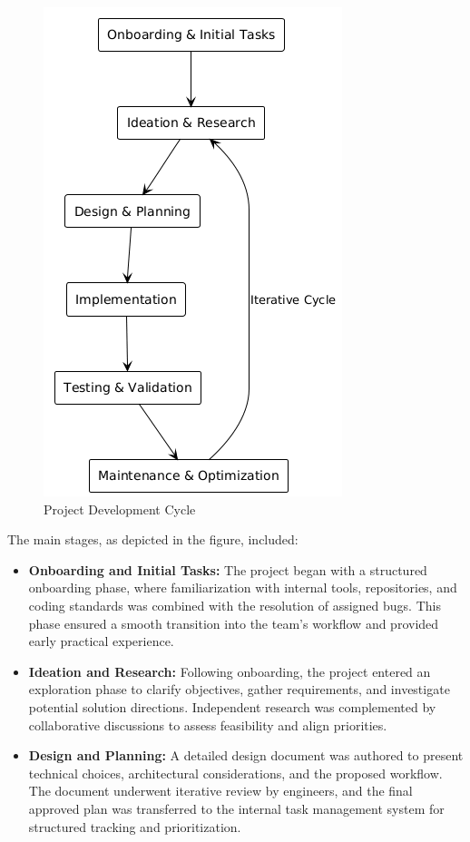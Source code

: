 \begin{spacing}{1.2}
\begin{figure}[H]
    \centering
    \includegraphics[scale=0.5]{Images/dev_process.png}
    \caption{Project Development Cycle}
    \label{fig:development_cycle}
\end{figure}

The main stages, as depicted in the figure, included:

\begin{itemize}
    \item \textbf{Onboarding and Initial Tasks:} The project began with a structured onboarding phase, where familiarization with internal tools, repositories, and coding standards was combined with the resolution of assigned bugs. This phase ensured a smooth transition into the team’s workflow and provided early practical experience.

    \item \textbf{Ideation and Research:} Following onboarding, the project entered an exploration phase to clarify objectives, gather requirements, and investigate potential solution directions. Independent research was complemented by collaborative discussions to assess feasibility and align priorities.

    \item \textbf{Design and Planning:} A detailed design document was authored to present technical choices, architectural considerations, and the proposed workflow. The document underwent iterative review by engineers, and the final approved plan was transferred to the internal task management system for structured tracking and prioritization.


\end{itemize}
\end{spacing}
